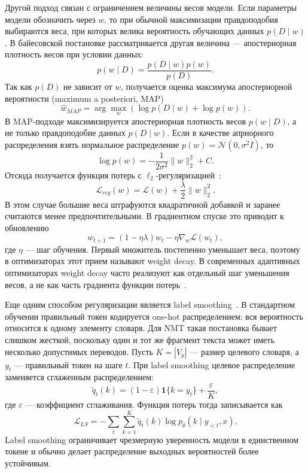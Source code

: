 Другой подход связан с ограничением величины весов модели.
Если параметры модели обозначить через $w$, то при обычной максимизации правдоподобия выбираются веса, при которых велика вероятность обучающих данных $p(D \mid w)$.
В байесовской постановке рассматривается другая величина --- апостериорная плотность весов при условии данных:
\[
	p(w \mid D) = \frac{p(D \mid w)p(w)}{p(D)}.
\]
Так как $p(D)$ не зависит от $w$, получается оценка максимума апостериорной вероятности (maximum a posteriori, MAP)
\[
	\hat{w}_{MAP} = \arg\max_w \left(\log p(D \mid w) + \log p(w)\right).
\]
В MAP-подходе максимизируется апостериорная плотность весов $p(w \mid D)$, а не только правдоподобие данных $p(D \mid w)$.
Если в качестве априорного распределения взять нормальное распределение $p(w) = \mathcal{N}(0, \sigma^2 I)$, то
\[
	\log p(w) = -\frac{1}{2\sigma^2}\|w\|_2^2 + C.
\]
Отсюда получается функция потерь с $\ell_2$-регуляризацией~\cite{dlbook}:
\[
	\mathcal{L}_{reg}(w) = \mathcal{L}(w) + \frac{\lambda}{2}\|w\|_2^2.
\]
В этом случае большие веса штрафуются квадратичной добавкой и заранее считаются менее предпочтительными.
В градиентном спуске это приводит к обновлению
\[
	w_{t+1} = (1 - \eta\lambda)w_t - \eta \nabla_w \mathcal{L}(w_t),
\]
где $\eta$ --- шаг обучения.
Первый множитель постепенно уменьшает веса, поэтому в оптимизаторах этот прием называют weight decay.
В современных адаптивных оптимизаторах weight decay часто реализуют как отдельный шаг уменьшения весов, а не как часть градиента функции потерь~\cite{adamw}.

Еще одним способом регуляризации является label smoothing~\cite{label_smoothing}.
В стандартном обучении правильный токен кодируется one-hot распределением: вся вероятность относится к одному элементу словаря.
Для NMT такая постановка бывает слишком жесткой, поскольку один и тот же фрагмент текста может иметь несколько допустимых переводов.
Пусть $K = |V_y|$ --- размер целевого словаря, а $y_t$ --- правильный токен на шаге $t$.
При label smoothing целевое распределение заменяется сглаженным распределением:
\[
	\tilde{q}_t(k) = (1 - \varepsilon)\mathbf{1}\{k = y_t\} + \frac{\varepsilon}{K},
\]
где $\varepsilon$ --- коэффициент сглаживания.
Функция потерь тогда записывается как
\[
	\mathcal{L}_{LS} = -\sum_t \sum_{k=1}^{K} \tilde{q}_t(k)
	\log p_\theta(k \mid y_{<t}, x).
\]
Label smoothing ограничивает чрезмерную уверенность модели в единственном токене и обычно делает распределение выходных вероятностей более устойчивым.
